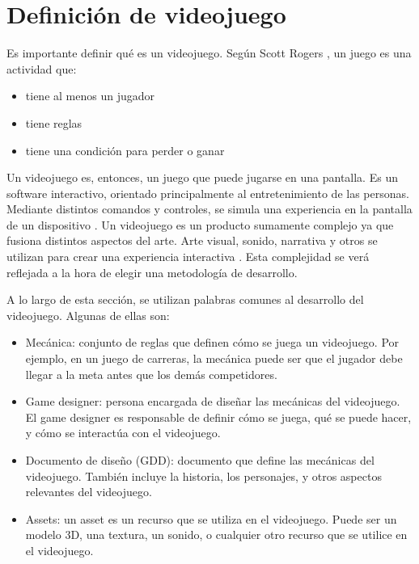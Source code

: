 \section{Definición de videojuego}
\par Es importante definir qué es un videojuego. Según Scott Rogers \cite{rogersLevelGuiaPara2024}, un juego es una actividad que:
\begin{itemize}
    \item tiene al menos un jugador
    \item tiene reglas
    \item tiene una condición para perder o ganar
\end{itemize}
\par Un videojuego es, entonces, un juego que puede jugarse en una pantalla. Es un software interactivo, orientado principalmente al entretenimiento de las personas. Mediante distintos comandos y controles, se simula una experiencia en la pantalla de un dispositivo \cite{alarconaldanaMetodologiaParaDesarrollo2020}. 
Un videojuego es un producto sumamente complejo ya que fusiona distintos aspectos del arte. Arte visual, sonido, narrativa y otros se utilizan para crear una experiencia interactiva \cite{garciaariasDesarrolloVideojuegosDesde2019}. Esta complejidad se verá reflejada a la hora de elegir una metodología de desarrollo.
\par A lo largo de esta sección, se utilizan palabras comunes al desarrollo del videojuego. Algunas de ellas son:
\begin{itemize}
    \item Mecánica: conjunto de reglas que definen cómo se juega un videojuego. Por ejemplo, en un juego de carreras, la mecánica puede ser que el jugador debe llegar a la meta antes que los demás competidores.
    \item Game designer: persona encargada de diseñar las mecánicas del videojuego. El game designer es responsable de definir cómo se juega, qué se puede hacer, y cómo se interactúa con el videojuego.
    \item Documento de diseño (GDD): documento que define las mecánicas del videojuego. También incluye la historia, los personajes, y otros aspectos relevantes del videojuego.
    \item Assets: un asset es un recurso que se utiliza en el videojuego. Puede ser un modelo 3D, una textura, un sonido, o cualquier otro recurso que se utilice en el videojuego.
\end{itemize} 

